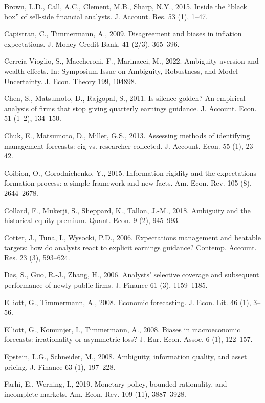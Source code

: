 \documentclass[12pt,a4paper]{article}
\newenvironment{original}
  {\par\medskip\noindent\ignorespaces}
  {\par\medskip}
\begin{document}
\begin{original}
\noindent Brown, L.D., Call, A.C., Clement, M.B., Sharp, N.Y., 2015. Inside the ``black box'' of sell-side financial analysts. J. Account. Res. 53 (1), 1--47.

\noindent Capistran, C., Timmermann, A., 2009. Disagreement and biases in inflation expectations. J. Money Credit Bank. 41 (2/3), 365--396.

\noindent Cerreia-Vioglio, S., Maccheroni, F., Marinacci, M., 2022. Ambiguity aversion and wealth effects. In: Symposium Issue on Ambiguity, Robustness, and Model Uncertainty. J. Econ. Theory 199, 104898.

\noindent Chen, S., Matsumoto, D., Rajgopal, S., 2011. Is silence golden? An empirical analysis of firms that stop giving quarterly earnings guidance. J. Account. Econ. 51 (1--2), 134--150.

\noindent Chuk, E., Matsumoto, D., Miller, G.S., 2013. Assessing methods of identifying management forecasts: cig vs. researcher collected. J. Account. Econ. 55 (1), 23--42.

\noindent Coibion, O., Gorodnichenko, Y., 2015. Information rigidity and the expectations formation process: a simple framework and new facts. Am. Econ. Rev. 105 (8), 2644--2678.

\noindent Collard, F., Mukerji, S., Sheppard, K., Tallon, J.-M., 2018. Ambiguity and the historical equity premium. Quant. Econ. 9 (2), 945--993.

\noindent Cotter, J., Tuna, I., Wysocki, P.D., 2006. Expectations management and beatable targets: how do analysts react to explicit earnings guidance? Contemp. Account. Res. 23 (3), 593--624.

\noindent Das, S., Guo, R.-J., Zhang, H., 2006. Analysts' selective coverage and subsequent performance of newly public firms. J. Finance 61 (3), 1159--1185.

\noindent Elliott, G., Timmermann, A., 2008. Economic forecasting. J. Econ. Lit. 46 (1), 3--56.

\noindent Elliott, G., Komunjer, I., Timmermann, A., 2008. Biases in macroeconomic forecasts: irrationality or asymmetric loss? J. Eur. Econ. Assoc. 6 (1), 122--157.

\noindent Epstein, L.G., Schneider, M., 2008. Ambiguity, information quality, and asset pricing. J. Finance 63 (1), 197--228.

\noindent Farhi, E., Werning, I., 2019. Monetary policy, bounded rationality, and incomplete markets. Am. Econ. Rev. 109 (11), 3887--3928.


\end{original}
\end{document}
